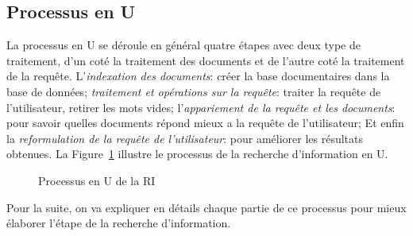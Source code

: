 \subsection{Processus en U}
La processus en U se déroule en général quatre étapes \citep{modern-ir} avec deux type de traitement, d'un coté la traitement des documents et de l'autre coté la traitement de la requête. L'\emph{indexation des documents}: créer la base documentaires dans la base de données; \emph{traitement et opérations sur la requête}: traiter la requête de l'utilisateur, retirer les mots vides; l'\emph{appariement de la requête et les documents}: pour savoir quelles documents répond mieux a la requête de l'utilisateur; Et enfin la \emph{reformulation de la requête de l'utilisateur}: pour améliorer les résultats obtenues. La Figure~\ref{fig:processus-u} illustre le processus de la recherche d'information en U.

\begin{figure}[htbp]
    \begin{center}
    \end{center}
    \caption{Processus en U de la RI \citep{thesaurus-ir-web}}\label{fig:processus-u}
\end{figure}

Pour la suite, on va expliquer en détails chaque partie de ce processus pour mieux élaborer l'étape de la recherche d'information.


